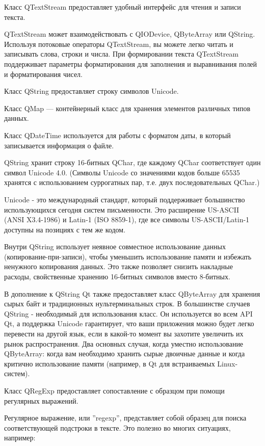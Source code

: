 Класс QTextStream предоставляет удобный интерфейс для чтения и записи текста.

QTextStream может взаимодействовать с QIODevice, QByteArray или QString. Используя потоковые операторы QTextStream, вы можете легко читать и записывать слова, строки и числа. При формировании текста QTextStream поддерживает параметры форматирования для заполнения и выравнивания полей и форматирования чисел. \cite{qtdoc}

Класс QString предоставляет строку символов Unicode.

Класс QMap --- контейнерный класс для хранения элементов различных типов данных.

Класс QDateTime используется для работы с форматом даты, в который записывается информация о файле.

QString хранит строку 16-битных QChar, где каждому QChar соответствует один символ Unicode 4.0. (Символы Unicode со значениями кодов больше 65535 хранятся с использованием суррогатных пар, т.е. двух последовательных QChar.)

Unicode - это международный стандарт, который поддерживает большинство использующихся сегодня систем письменности. Это расширение US-ASCII (ANSI X3.4-1986) и Latin-1 (ISO 8859-1), где все символы US-ASCII/Latin-1 доступны на позициях с тем же кодом.

Внутри QString использует неявное совместное использование данных (копирование-при-записи), чтобы уменьшить использование памяти и избежать ненужного копирования данных. Это также позволяет снизить накладные расходы, свойственные хранению 16-битных символов вместо 8-битных.

В дополнение к QString Qt также предоставляет класс QByteArray для хранения сырых байт и традиционных нультерминальных строк. В большинстве случаев QString - необходимый для использования класс. Он используется во всем API Qt, а поддержка Unicode гарантирует, что ваши приложения можно будет легко перевести на другой язык, если в какой-то момент вы захотите увеличить их рынок распространения. Два основных случая, когда уместно использование QByteArray: когда вам необходимо хранить сырые двоичные данные и когда критично использование памяти (например, в Qt для встраиваемых Linux-систем).\cite{qtcross}

Класс QRegExp предоставляет сопоставление с образцом при помощи регулярных выражений.

Регулярное выражение, или ''regexp'', представляет собой образец для поиска соответствующей подстроки в тексте. Это полезно во многих ситуациях, например:

